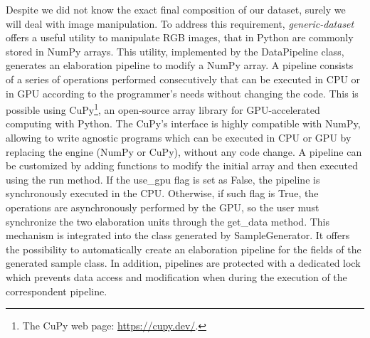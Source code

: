 Despite we did not know the exact final composition of our dataset, surely we will deal with image manipulation. To address this requirement,  \textit{generic-dataset} offers a useful utility to manipulate RGB images, that in Python are commonly stored in NumPy arrays. This utility, implemented by the \textsf{DataPipeline} class, generates an elaboration pipeline to modify a NumPy array. A pipeline consists of a series of operations performed consecutively that can be executed in CPU or in GPU according to the programmer's needs without changing the code. This is possible using CuPy\footnote{The CuPy web page: \url{https://cupy.dev/}.}, an open-source array library for GPU-accelerated computing with Python. The CuPy's interface is highly compatible with NumPy, allowing to write agnostic programs which can be executed in CPU or GPU by replacing the engine (NumPy or CuPy), without any code change. A pipeline can be customized by adding functions to modify the initial array and then executed using the \textsf{run} method. If the \textsf{use\_gpu} flag is set as \textsf{False}, the pipeline is synchronously executed in the CPU. Otherwise, if such flag is \textsf{True}, the operations are asynchronously performed by the GPU, so the user must synchronize the two elaboration units through the \textsf{get\_data} method. This mechanism is integrated into the class generated by \textsf{SampleGenerator}. It offers the possibility to automatically create an elaboration pipeline for the fields of the generated sample class. In addition, pipelines are protected with a dedicated lock which prevents data access and modification when during the execution of the correspondent pipeline.

